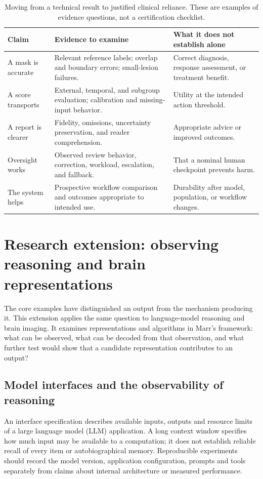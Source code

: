 \documentclass[11pt,a4paper]{article}
\begin{document}
\begin{table}[htbp]\centering\small
\caption{Moving from a technical result to justified clinical reliance. These are examples of evidence questions, not a certification checklist.}
\begin{tabularx}{\linewidth}{p{28mm}XX}\toprule
Claim & Evidence to examine & What it does not establish alone \\\midrule
A mask is accurate & Relevant reference labels; overlap and boundary errors; small-lesion failures. & Correct diagnosis, response assessment, or treatment benefit.\\
A score transports & External, temporal, and subgroup evaluation; calibration and missing-input behavior. & Utility at the intended action threshold.\\
A report is clearer & Fidelity, omissions, uncertainty preservation, and reader comprehension. & Appropriate advice or improved outcomes.\\
Oversight works & Observed review behavior, correction, workload, escalation, and fallback. & That a nominal human checkpoint prevents harm.\\
The system helps & Prospective workflow comparison and outcomes appropriate to intended use. & Durability after model, population, or workflow changes.\\\bottomrule
\end{tabularx}\label{tab:evidence}
\end{table}


\section{Research extension: observing reasoning and brain representations}\label{sec:research}
The core examples have distinguished an output from the mechanism producing it. This extension applies the same question to language-model reasoning and brain imaging. It examines representations and algorithms in Marr's framework: what can be observed, what can be decoded from that observation, and what further test would show that a candidate representation contributes to an output?

\subsection{Model interfaces and the observability of reasoning}
An interface specification describes available inputs, outputs and resource limits of a large language model (LLM) application. A long context window specifies how much input may be available to a computation; it does not establish reliable recall of every item or autobiographical memory. Reproducible experiments should record the model version, application configuration, prompts and tools separately from claims about internal architecture or measured performance.
\end{document}

